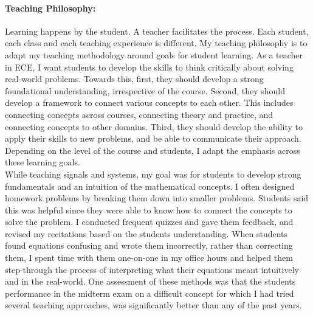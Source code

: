 \documentclass[10pt]{article}
\begin{document}
\paragraph{Teaching Philosophy: }
Learning happens by the student. A teacher facilitates the process.  Each student, each class and each teaching experience is different. My teaching philosophy is to adapt my teaching methodology around goals for student learning. 
As a teacher in ECE, I want students to develop the skills to think critically about solving real-world problems. 
Towards this, first, they should develop a strong foundational understanding, irrespective of the course. Second, they should develop a framework to connect various concepts to each other. This includes connecting concepts across courses, connecting theory and practice,  and connecting concepts to other domains. Third, they should develop the ability to apply their skills to new problems, and be able to communicate their approach. Depending on the level of the course and students, I adapt the emphasis across these learning goals.\\


While teaching signals and systems, my goal was for students to develop strong fundamentals and an intuition of the mathematical concepts.
I often designed homework problems by breaking them down into smaller problems. Students said this was helpful since they were able to know how to connect the concepts to solve the problem. 
I conducted frequent quizzes and gave them feedback, and revised my recitations based on the students understanding. 
When students found equations confusing and wrote them incorrectly, rather than correcting them, I spent time with them one-on-one in my office hours and helped them step-through the process of interpreting what their equations meant intuitively and in the real-world. %
One assessment of these methods was that the students performance in the midterm exam on a difficult concept for which I had tried several teaching approaches, was significantly better than any of the past years. \\
\end{document}
